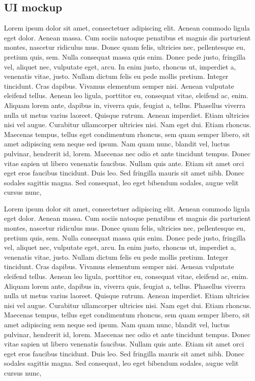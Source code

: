 \documentclass[12pt]{article}
\begin{document}
\subsection{UI mockup}
Lorem ipsum dolor sit amet, consectetuer adipiscing elit. Aenean commodo ligula eget dolor. Aenean massa. Cum sociis natoque penatibus et magnis dis parturient montes, nascetur ridiculus mus. Donec quam felis, ultricies nec, pellentesque eu, pretium quis, sem. Nulla consequat massa quis enim. Donec pede justo, fringilla vel, aliquet nec, vulputate eget, arcu. In enim justo, rhoncus ut, imperdiet a, venenatis vitae, justo. Nullam dictum felis eu pede mollis pretium. Integer tincidunt. Cras dapibus. Vivamus elementum semper nisi. Aenean vulputate eleifend tellus. Aenean leo ligula, porttitor eu, consequat vitae, eleifend ac, enim. Aliquam lorem ante, dapibus in, viverra quis, feugiat a, tellus. Phasellus viverra nulla ut metus varius laoreet. Quisque rutrum. Aenean imperdiet. Etiam ultricies nisi vel augue. Curabitur ullamcorper ultricies nisi. Nam eget dui. Etiam rhoncus. Maecenas tempus, tellus eget condimentum rhoncus, sem quam semper libero, sit amet adipiscing sem neque sed ipsum. Nam quam nunc, blandit vel, luctus pulvinar, hendrerit id, lorem. Maecenas nec odio et ante tincidunt tempus. Donec vitae sapien ut libero venenatis faucibus. Nullam quis ante. Etiam sit amet orci eget eros faucibus tincidunt. Duis leo. Sed fringilla mauris sit amet nibh. Donec sodales sagittis magna. Sed consequat, leo eget bibendum sodales, augue velit cursus nunc,


Lorem ipsum dolor sit amet, consectetuer adipiscing elit. Aenean commodo ligula eget dolor. Aenean massa. Cum sociis natoque penatibus et magnis dis parturient montes, nascetur ridiculus mus. Donec quam felis, ultricies nec, pellentesque eu, pretium quis, sem. Nulla consequat massa quis enim. Donec pede justo, fringilla vel, aliquet nec, vulputate eget, arcu. In enim justo, rhoncus ut, imperdiet a, venenatis vitae, justo. Nullam dictum felis eu pede mollis pretium. Integer tincidunt. Cras dapibus. Vivamus elementum semper nisi. Aenean vulputate eleifend tellus. Aenean leo ligula, porttitor eu, consequat vitae, eleifend ac, enim. Aliquam lorem ante, dapibus in, viverra quis, feugiat a, tellus. Phasellus viverra nulla ut metus varius laoreet. Quisque rutrum. Aenean imperdiet. Etiam ultricies nisi vel augue. Curabitur ullamcorper ultricies nisi. Nam eget dui. Etiam rhoncus. Maecenas tempus, tellus eget condimentum rhoncus, sem quam semper libero, sit amet adipiscing sem neque sed ipsum. Nam quam nunc, blandit vel, luctus pulvinar, hendrerit id, lorem. Maecenas nec odio et ante tincidunt tempus. Donec vitae sapien ut libero venenatis faucibus. Nullam quis ante. Etiam sit amet orci eget eros faucibus tincidunt. Duis leo. Sed fringilla mauris sit amet nibh. Donec sodales sagittis magna. Sed consequat, leo eget bibendum sodales, augue velit cursus nunc,
\end{document}
